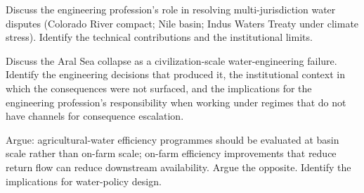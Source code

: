 \begin{exercise}
Discuss the engineering profession's role in resolving multi-jurisdiction water disputes (Colorado River compact; Nile basin; Indus Waters Treaty under climate stress). Identify the technical contributions and the institutional limits.
\end{exercise}

\begin{exercise}
Discuss the Aral Sea collapse as a civilization-scale water-engineering failure. Identify the engineering decisions that produced it, the institutional context in which the consequences were not surfaced, and the implications for the engineering profession's responsibility when working under regimes that do not have channels for consequence escalation.
\end{exercise}

\begin{exercise}
Argue: agricultural-water efficiency programmes should be evaluated at basin scale rather than on-farm scale; on-farm efficiency improvements that reduce return flow can reduce downstream availability. Argue the opposite. Identify the implications for water-policy design.
\end{exercise}
